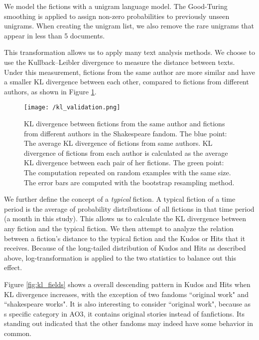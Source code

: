\documentclass[11pt]{article} %
\begin{document}
We model the fictions with a unigram language model. The Good-Turing smoothing\cite{gales1995good} is applied to assign non-zero probabilities to previously unseen unigrams. When creating the unigram list, we also remove the rare unigrams that appear in less than 5 documents.

This transformation allows us to apply many text analysis methods. We choose to use the Kullback--Leibler divergence to measure the distance between texts. Under this measurement, fictions from the same author are more similar and have a smaller KL divergence between each other, compared to fictions from different authors, as shown in Figure \ref{fig:kl_validation}.

\begin{figure}[htbp]
\begin{center}
\texttt{[image: /kl\_validation.png]}
\caption{KL divergence between fictions from the same author and fictions from different authors in the Shakespeare fandom. The blue point: The average KL divergence of fictions from same authors. KL divergence of fictions from each author is calculated as the average KL divergence between each pair of her fictions. The green point: The computation repeated on random examples with the same size. The error bars are computed with the bootstrap resampling method. }
\label{fig:kl_validation}
\end{center}
\end{figure}

We further define the concept of a \emph{typical} fiction. A typical fiction of a time period is the average of probability distributions of all fictions in that time period (a month in this study). This allows us to calculate the KL divergence between any fiction and the typical fiction. We then attempt to analyze the relation between a fiction's distance to the typical fiction and the Kudos or Hits that it receives. Because of the long-tailed distribution of Kudos and Hits as described above, log-transformation is applied to the two statistics to balance out this effect. 
 
Figure \ref{fig:kl_fields} shows a overall descending pattern in Kudos and Hits when KL divergence increases, with the exception of two fandoms ``original work" and ``shakespeare works". It is also interesting to consider ``original work", because as s specific category in AO3, it contains original stories instead of fanfictions. Its standing out indicated that the other fandoms may indeed have some behavior in common. 
\end{document}
